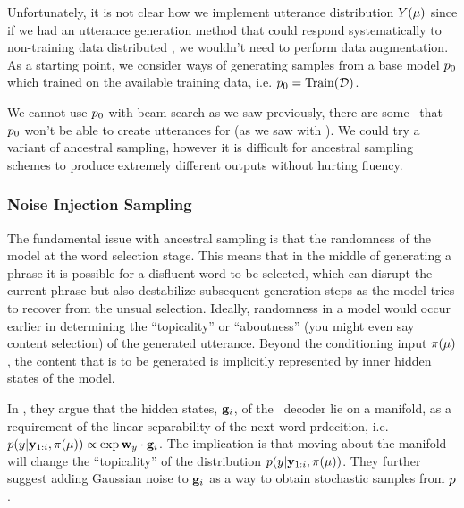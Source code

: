 Unfortunately, it is not clear how we implement utterance distribution
$Y(\mu)$ since if we had an utterance generation method that could
respond systematically to non-training data distributed \meaningrepresentations, we wouldn't need to perform data augmentation. As a starting point, 
we consider ways of generating samples from a base model $p_0$ which 
trained on the available training data, i.e. $p_0 = \operatorname{Train}(\mathcal{D})$.

We cannot use $p_0$ with beam search as we saw previously,
there are some \meaningrepresentations~that $p_0$ won't be able to create utterances for (as we saw with ). We could try a variant
of ancestral sampling, however 
it is difficult for ancestral sampling schemes to produce 
extremely different outputs without hurting fluency. 


\subsubsection{Noise Injection Sampling}

The fundamental issue with ancestral sampling is that the randomness of the
model at the word selection stage. This means that in the middle of generating
a phrase it is possible for a disfluent word to be selected, which can
disrupt the current phrase but also destabilize subsequent generation steps
as the model tries to recover from the unsual selection.
Ideally, randomness in a model would occur earlier in determining the 
``topicality'' or ``aboutness'' (you might even say content selection) 
of the generated utterance. Beyond the conditioning input $\pi(\mu)$,
the content that is to be generated is implicitly represented by
inner hidden states of the model. 

In \citet{cho}, they argue that the hidden states, $\mathbf{g}_i$, 
of the \sequencetosequence~decoder lie on a manifold, as a requirement of
the linear separability of the next word prdecition, i.e.
$p(y|\mathbf{y}_{1:i},\pi(\mu)) \propto \exp \mathbf{w}_y \cdot \mathbf{g}_i$. The implication is that moving about the manifold will change 
the ``topicality'' of the distribution $p(y|\mathbf{y}_{1:i},\pi(\mu))$.
They further suggest adding Gaussian noise to $\mathbf{g}_i$ as a way to
obtain stochastic samples from $p$. 




